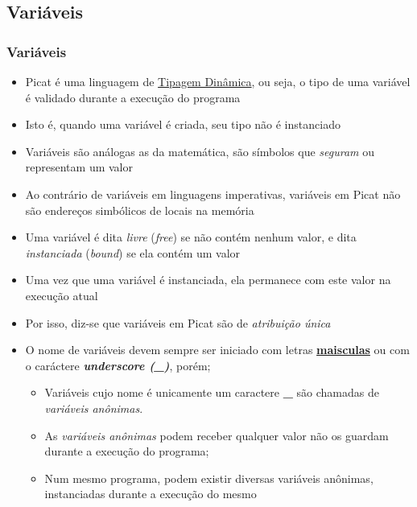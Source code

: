 
\subsection{Variáveis}

\begin{frame}[allowframebreaks=0.90]
	\frametitle{Variáveis}
	
	\begin{itemize}
		
		\item Picat é uma linguagem de \underline{Tipagem Dinâmica}, ou seja, o tipo de uma variável 
		é validado durante a execução do programa
		
		
		\item Isto é, quando uma variável é criada, seu tipo não é instanciado
		
		\item Variáveis são análogas as da matemática, são símbolos que \textit{seguram} ou 
		representam um valor
		
		\item Ao contrário de variáveis em linguagens imperativas, variáveis em Picat não são
		endereços simbólicos de locais na memória
		
		\item Uma variável é dita \textit{livre} (\textit{free}) se não contém nenhum valor, e dita
		\textit{instanciada} (\textit{bound}) se ela contém um valor
		
		\item Uma vez que uma variável é instanciada, ela permanece com este valor na 
		execução atual
		
		\item Por isso, diz-se que variáveis em Picat são de \textit{atribuição única}
		
		\framebreak
		\item O nome de variáveis devem sempre ser iniciado com letras \textbf{\underline{maisculas}}
		ou  com o caráctere \textbf{\textit{underscore (\_)}}, porém;
		
		\begin{itemize}
			
			\item Variáveis cujo nome é unicamente um caractere \textbf{\_} são chamadas de 
			\textit{variáveis anônimas}.
			
			\item As 			\textit{variáveis anônimas} podem receber qualquer  valor
			 não os guardam  durante a execução do programa;
			
			\item Num mesmo programa, podem existir diversas variáveis anônimas, instanciadas durante a execução do mesmo
			
		\end{itemize}
		
	\end{itemize}
	
\end{frame}

